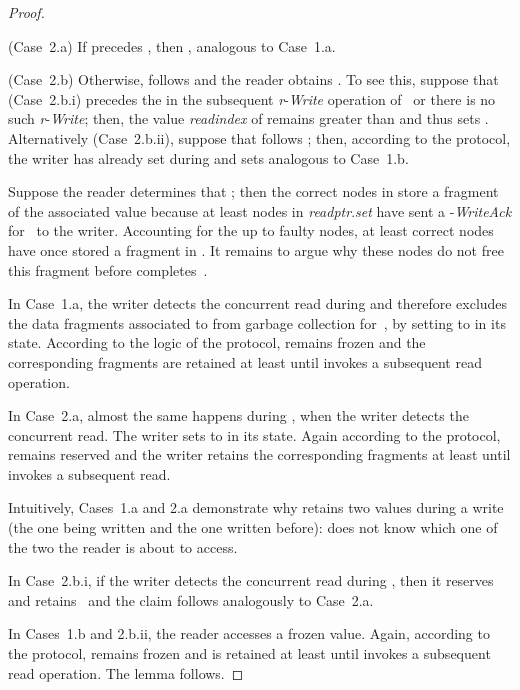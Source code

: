 \documentclass[oribibl]{llncs}
\theoremstyle{definition-boldhead}
\newcommand{\var}[1]{\textit{#1}}
\newcommand{\op}[1]{\textsl{#1}}
\newcommand{\nodes}{nodes\xspace}
\begin{document}
\begin{proof}
\begin{description}
    (Case~2.a) If \scanrd precedes , then , analogous to Case~1.a.

    (Case~2.b) Otherwise, \scanrd follows  and the
    reader obtains .  To see this,
    suppose that (Case~2.b.i) \scanrd precedes the  in
    the subsequent \var{r}-\op{Write} operation of~ or there is no
    such \var{r}-\op{Write}; then, the value \var{readindex} of 
    remains greater than  and thus  sets
    .  Alternatively (Case~2.b.ii),
    suppose that \scanrd follows ; then, according to
    the protocol, the writer has already set  during  and  sets  analogous to Case~1.b.
  \end{description}

  Suppose the reader determines that ; then the correct \nodes in 
  store a fragment of the associated value because at least 
  \nodes in \var{readptr}.\var{set} have sent a
  \var{}-\op{WriteAck} for~ to the writer.
  Accounting for the up to  faulty \nodes, at least  correct
  \nodes have once stored a fragment in .
It remains to argue why these \nodes do not free this fragment
  before  completes~.

  In Case~1.a, the writer detects the concurrent read during 
  and therefore excludes the data fragments associated to 
  from garbage collection for~, by setting
    to  in its state.
  According to the logic of the protocol,  remains frozen
  and the corresponding fragments are retained at least until  invokes
  a subsequent read operation.


  In Case~2.a, almost the same happens during , when the
  writer detects the concurrent read.  The writer sets
   to  in its state.
  Again according to the protocol,  remains reserved and
  the writer retains the corresponding fragments at least until 
  invokes a subsequent read.

Intuitively, Cases~1.a and 2.a demonstrate why  retains two
  values during a write (the one being written and the one written
  before):  does not know which one of the two the reader is about
  to access.

  In Case~2.b.i, if the writer detects the concurrent read during
  , then it reserves and retains~ and the claim
  follows analogously to Case~2.a.

  In Cases~1.b and 2.b.ii, the reader accesses a frozen value.  Again,
  according to the protocol,  remains frozen and is retained
  at least until  invokes a subsequent read operation.  The lemma follows.
\end{proof}
\fi
\end{document}
